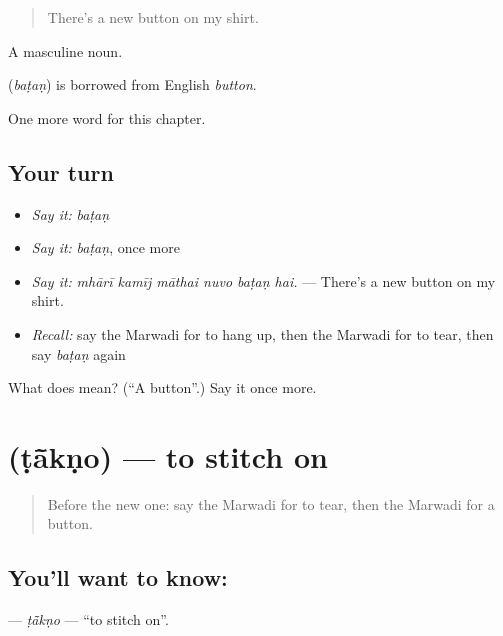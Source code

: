 \begin{quote}
There's a new button on my shirt.
\end{quote}

A masculine noun.

\begin{cousinweb}
\textbf{} (\emph{baṭaṇ}) is borrowed from English \emph{button}.
\end{cousinweb}

\begin{grammarlens}[title={What you've built}]
One more word for this chapter.
\end{grammarlens}

\subsection*{Your turn}
\begin{itemize}
\raggedright
  \item \emph{Say it:} \emph{baṭaṇ}
  \item \emph{Say it:} \emph{baṭaṇ}, once more
  \item \emph{Say it:} \emph{mhārī kamīj māthai nuvo baṭaṇ hai.} — There's a new button on my shirt.
  \item \emph{Recall:} say the Marwadi for to hang up, then the Marwadi for to tear, then say \emph{baṭaṇ} again
\end{itemize}

\begin{tcolorbox}[breakable,colback=teal!4,colframe=teal!35!black,title={Before you move on}]
What does  mean? (\textquotedblleft{}A button\textquotedblright{}.) Say it once more.
\end{tcolorbox}
\section[\texorpdfstring{\mw{टांकणो} (ṭā̃kṇo)}{टांकणो (ṭā̃kṇo)}]{ (ṭā̃kṇo) — to stitch on}

\label{lesson:MW-C177-takno}



\begin{quote}
Before the new one: say the Marwadi for to tear, then the Marwadi for a button.
\end{quote}

\subsection*{You'll want to know: }
\textbf{} — \emph{ṭā̃kṇo} — \textquotedblleft{}to stitch on\textquotedblright{}.

